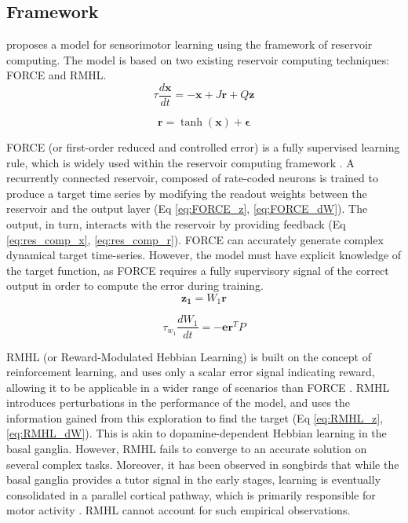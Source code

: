 \subsection{Framework}

\textcite{pyle2019} proposes a model for sensorimotor learning using the framework of reservoir computing. The model is based on two existing reservoir computing techniques: FORCE and RMHL.\\

\begin{equation}
    \tau \frac{d \mathbf{x}}{d t}=-\mathbf{x}+J \mathbf{r}+Q \mathbf{z}
    \label{eq:res_comp_x}
\end{equation}

\begin{equation}
    \mathbf{r}=\tanh (\mathbf{x})+\mathbf{\epsilon}
    \label{eq:res_comp_r}
\end{equation}

FORCE (or first-order reduced and controlled error) is a fully supervised learning rule, which is widely used within the reservoir computing framework \cite{sussillo2009}. A recurrently connected reservoir, composed of rate-coded neurons is trained to produce a target time series by modifying the readout weights between the reservoir and the output layer (Eq \ref{eq:FORCE_z}, \ref{eq:FORCE_dW}). The output, in turn, interacts with the reservoir by providing feedback (Eq \ref{eq:res_comp_x}, \ref{eq:res_comp_r}). FORCE can accurately generate complex dynamical target time-series. However, the model must have explicit knowledge of the target function, as FORCE requires a fully supervisory signal of the correct output in order to compute the error during training. \\


\begin{equation}
    \mathbf{z_1}=W_1 \mathbf{r}
    \label{eq:FORCE_z}
\end{equation}

\begin{equation}
    \tau_{w_1} \frac{d W_1}{d t}=-\mathbf{e r}^{T} P
    \label{eq:FORCE_dW}
\end{equation}

RMHL (or Reward-Modulated Hebbian Learning) is built on the concept of reinforcement learning, and uses only a scalar error signal indicating reward, allowing it to be applicable in a wider range of scenarios than FORCE \cite{hoerzer2014}. RMHL introduces perturbations in the performance of the model, and uses the information gained from this exploration to find the target (Eq \ref{eq:RMHL_z}, \ref{eq:RMHL_dW}). This is akin to dopamine-dependent Hebbian learning in the basal ganglia. However, RMHL fails to converge to an accurate solution on several complex tasks. Moreover, it has been observed in songbirds that while the basal ganglia provides a tutor signal in the early stages, learning is eventually consolidated in a parallel cortical pathway, which is primarily responsible for motor activity \cite{olveczky2011}. RMHL cannot account for such empirical observations.\\


